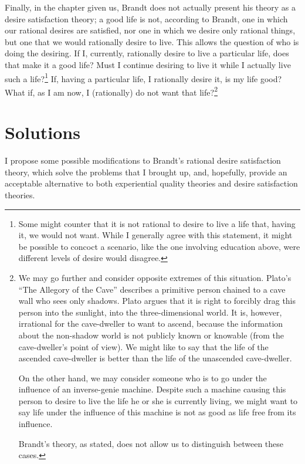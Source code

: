 \documentclass[letterpaper,11pt,twoside]{article}
\begin{document}
    Finally, in the chapter given us, Brandt does not actually present his theory as a desire satisfaction theory; a good life is not, according to Brandt, one in which our rational desires are satisfied, nor one in which we desire only rational things, but one that we would rationally desire to live.  This allows the question of who is doing the desiring. If I, currently, rationally desire to live a particular life, does that make it a good life?  Must I continue desiring to live it while I actually live such a life?\footnote{Some might counter that it is not rational to desire to live a life that, having it, we would not want.  While I generally agree with this statement, it might be possible to concoct a scenario, like the one involving education above, were different levels of desire would disagree.}  If, having a particular life, I rationally desire it, is my life good?  What if, as I am now, I (rationally) do not want that life?\footnote{We may go further and consider opposite extremes of this situation.  Plato's ``The Allegory of the Cave''\footnotemark{} describes a primitive person chained to a cave wall who sees only shadows.  Plato argues that it is right to forcibly drag this person into the sunlight, into the three-dimensional world.  It is, however, irrational for the cave-dweller to want to ascend, because the information about the non-shadow world is not publicly known or knowable (from the cave-dweller's point of view).  We might like to say that the life of the ascended cave-dweller is better than the life of the unascended cave-dweller.  \par
    On the other hand, we may consider someone who is to go under the influence of an inverse-genie machine.  Despite such a machine causing this person to desire to live the life he or she is currently living, we might want to say life under the influence of this machine is not as good as life free from its influence.  \par
    Brandt's theory, as stated, does not allow us to distinguish between these cases.}

\section*{Solutions}
  I propose some possible modifications to Brandt's rational desire satisfaction theory, which solve the problems that I brought up, and, hopefully, provide an acceptable alternative to both experiential quality theories and desire satisfaction theories.
\end{document}
